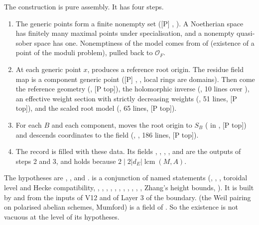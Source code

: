 \documentclass[11pt]{article}
\newcommand{\mP}{\textsf{[P]}}
\newcommand{\mPt}{\textsf{[P top]}}
\theoremstyle{remark}
\begin{document}
The construction is pure assembly. It has four steps.
\begin{enumerate}[nosep]
\item The generic points form a finite nonempty set (\mP{} , ). A Noetherian space has finitely many maximal points under specialisation, and a nonempty quasi-sober space has one. Nonemptiness of the model comes from  of  (existence of a point of the moduli problem), pulled back to $\mathcal O_F$.
\item At each generic point $x$,  produces a reference root origin. The residue field map is a component generic point (\mP{} , , local rings are domains). Then come the reference geometry (, \mPt), the holomorphic inverse (, 10 lines over ), an effective weight section with strictly decreasing weights (, 51 lines, \mPt), and the scaled root model (, 65 lines, \mPt).
\item For each $B$ and each component,  moves the root origin to $S_B$ ( in , \mPt) and descends coordinates to the field (, , 186 lines, \mPt).
\item The record  is filled with these data. Its fields , , , ,  and  are the outputs of steps 2 and 3, and  holds because $2\mid2\lvert d_E\rvert\operatorname{lcm}(M,A)$.
\end{enumerate}
The hypotheses are , ,  and .  is a conjunction of named statements (, , , toroidal level and Hecke compatibility, , , , , , , , , , , , Zhang's height bounds, ). It is built by  and  from the inputs of V12 and of Layer 3 of the boundary.  (the Weil pairing on polarised abelian schemes, Mumford) is a field of . So the existence is not vacuous at the level of its hypotheses.
\end{document}
